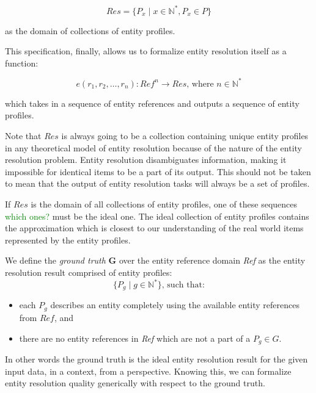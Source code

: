 \documentclass[journal]{IEEEtran}
\begin{document}
    \[
        Res=\{P_x \mid x \in \mathbb{N^*}, P_x \in P\}
    \]

    \noindent
    as the domain of collections of entity profiles.

    This specification, finally, allows us to formalize entity resolution itself as a function:

    \[
        e(r_1, r_2, \ldots, r_n): Ref^n \rightarrow Res\text{, where }n\in\mathbb{N^*}
    \]
    
    \noindent
    which takes in a sequence of entity references and outputs a sequence of
    entity profiles.

    Note that $Res$ is always going to be a collection containing unique entity
    profiles in any theoretical model of entity resolution because of the nature
    of the entity resolution problem.
    Entity resolution disambiguates information, making it impossible for
    identical items to be a part of its output.
    This should not be taken to mean that the output of entity resolution tasks
    will always be a set of profiles.

    If $Res$ is the domain of all collections of entity profiles, one of
    these sequences 
    \textcolor{green}{which ones?} 
    must be the ideal one.
    The ideal collection of entity profiles contains the approximation which is
    closest to our understanding of the real world items represented by the
    entity profiles.

    \begin{defn}
        We define the \textit{ground truth} \textbf{G} over the entity reference
        domain \textit{Ref} as the entity resolution result comprised of entity
        profiles:
        \[
            \{P_g \mid g \in \mathbb{N^*}\}\textrm{, such that:}
        \]
        \begin{itemize}
            \item each $P_g$ describes an entity completely using the available
            entity references from $Ref$, and
            \item there are no entity references in \textit{Ref} which are not a
            part of a $P_g \in G$.
        \end{itemize}
    \end{defn}

    In other words the ground truth is the ideal entity resolution result for 
    the given input data, in a context, from a perspective.
    Knowing this, we can formalize entity resolution quality generically with
    respect to the ground truth.
    
\end{document}
